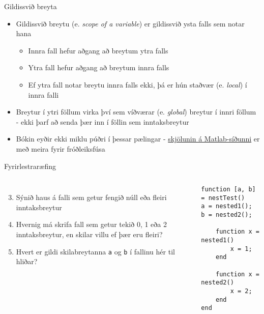\documentclass{beamer}
\begin{document}
\begin{frame}{Gildissvið breyta}
\vspace{\baselineskip}
\begin{itemize}
 \item Gildissvið breytu (e. \emph{scope of a variable}) er gildissvið ysta falls sem notar hana
 \begin{itemize}
  \item Innra fall hefur aðgang að breytum ytra falls
  \item Ytra fall hefur aðgang að breytum innra falls
  \item Ef ytra fall notar breytu innra falls ekki, þá er hún staðvær (e. \emph{local}) í innra falli
 \end{itemize}
 \item Breytur í ytri föllum virka því sem víðværar (e. \emph{global}) breytur í innri föllum - ekki þarf að senda þær inn í föllin sem inntaksbreytur
 \item Bókin eyðir ekki miklu púðri í þessar pælingar - \href{http://se.mathworks.com/help/matlab/matlab_prog/nested-functions.html?refresh=true}{skjölunin á Matlab-síðunni} er með meira fyrir fróðleiksfúsa
\end{itemize}
\end{frame}

\begin{frame}[fragile]{Fyrirlestraræfing}
\begin{columns}
\begin{enumerate}
 \setcounter{enumi}{2}
 \item Sýnið haus á falli sem getur fengið núll eða fleiri inntaksbreytur
 \item Hvernig má skrifa fall sem getur tekið 0, 1 eða 2 inntaksbreytur, en skilar villu ef þær eru fleiri?
 \item Hvert er gildi skilabreytanna \texttt{a} og \texttt{b} í fallinu hér til hliðar?
\end{enumerate}
\begin{verbatim}
function [a, b] = nestTest()
a = nested1();
b = nested2();

    function x = nested1()
        x = 1;
    end

    function x = nested2()
        x = 2;
    end
end
\end{verbatim}

\end{columns}
\end{frame}
\end{document}

